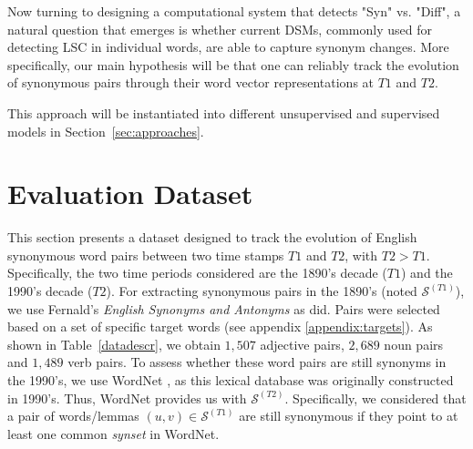 \documentclass[11pt]{article}
\newcommand{\synonymsSet}{\mathcal{S}}
\begin{document}
Now turning to designing a computational system that detects "Syn" vs. "Diff", a natural question that emerges is whether current DSMs, commonly used for detecting LSC in individual words, are able to capture synonym changes. 
More specifically, our main hypothesis will be that one can reliably track the evolution of synonymous pairs through their word vector representations at $T1$ and $T2$. 

This approach will be instantiated into different unsupervised and supervised models in Section~\ref{sec:approaches}. 



\section{Evaluation Dataset}
\label{sec:dataset}

This section presents a dataset designed to track the evolution of English synonymous word pairs between two time stamps $T1$ and $T2$, with $T2>T1$. Specifically, the two time periods considered are the 1890's decade ($T1$) and the 1990's decade ($T2$). 
For extracting synonymous pairs in the 1890's (noted $\synonymsSet^{(T1)}$), we use Fernald's \textit{English Synonyms and Antonyms} \citep{fernald1896english} as \citet{xu-kemp-2015-evaluation} did. Pairs were selected based on a set of specific target words (see appendix \ref{appendix:targets}). As shown in Table~\ref{datadescr}, we obtain $1,507$ adjective pairs, $2,689$ noun pairs and $1,489$ verb pairs. 
To assess whether these word pairs are still synonyms in the 1990's, we use WordNet \citep{fellbaum2010wordnet}, as this lexical database  was originally constructed in 1990's. Thus, WordNet provides us with $\synonymsSet^{(T2)}$. Specifically, we considered that a pair of words/lemmas $(u,v)\in\synonymsSet^{(T1)}$ are still synonymous if they point to at least one common \textit{synset} in WordNet. 
\end{document}
